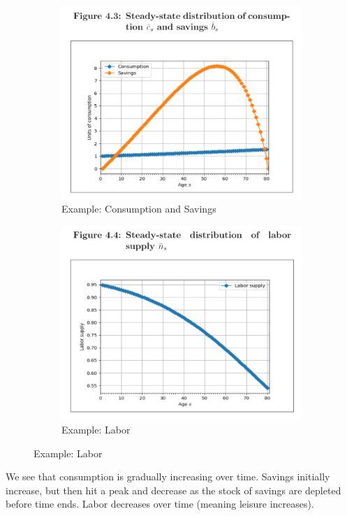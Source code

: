 \documentclass[12pt]{article}
\begin{document}
\begin{figure}[h]
	\begin{subfigure}[b]{0.45\textwidth}
		\includegraphics[width=\textwidth]{examplefig_c_s.png}
		\caption{Example: Consumption and Savings}
	\end{subfigure}
	\hfill
	\begin{subfigure}[b]{0.45\textwidth}
		\includegraphics[width=\textwidth]{examplefig_L.png}
		\caption{Example: Labor}
	\end{subfigure}
\end{figure}

\noindent We see that consumption is gradually increasing over time. Savings initially increase, but then hit a peak and decrease as the stock of savings are depleted before time ends. Labor decreases over time (meaning leisure increases).
\end{document}
